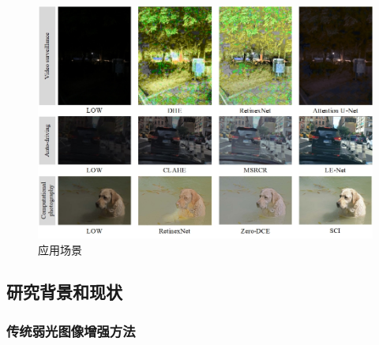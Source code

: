 \documentclass[CJK,aspectratio=169]{beamer}  %
\begin{document}
\begin{frame}
\begin{figure}
\begin{minipage}{.4\columnwidth}
\begin{itemize}
				\end{itemize}
			\end{minipage}
			\begin{minipage}{.55\columnwidth}
				\setlength{\abovecaptionskip}{-0.05cm}
				\centering
				\includegraphics[width=\linewidth]{picture/LLIE/application scenarios}
				\caption{
					\label{fig: application scenarios}
					\tiny 应用场景
				}
			\end{minipage}
		\end{figure}
	\end{frame}
	
	\subsection{研究背景和现状}
	
	\subsubsection{传统弱光图像增强方法}
	
\end{document}
